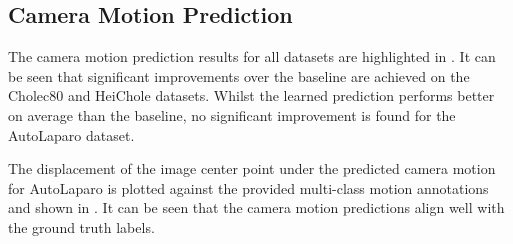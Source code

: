 \begin{table}[htb]
    \caption{Memory footprint and execution time of different camera motion estimators, refer to .}
    \label{c4:tab:estimation_speed}
    \centering
\end{table}

\subsection{Camera Motion Prediction}
The camera motion prediction results for all datasets are highlighted in . It can be seen that significant improvements over the baseline are achieved on the Cholec80 and HeiChole datasets. Whilst the learned prediction performs better on average than the baseline, no significant improvement is found for the AutoLaparo dataset.

The displacement of the image center point under the predicted camera motion for AutoLaparo is plotted against the provided multi-class motion annotations and shown in . It can be seen that the camera motion predictions align well with the ground truth labels.

